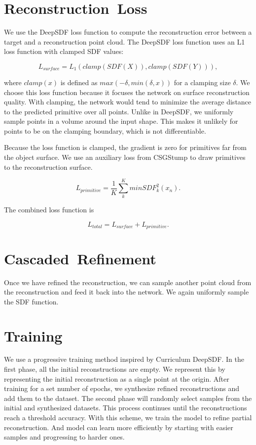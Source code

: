 \section{Reconstruction~Loss}
\label{sec:reconstruction_loss}

We use the DeepSDF loss function to compute the reconstruction error between a target and a reconstruction point cloud. The DeepSDF loss function uses an L1 loss function with clamped SDF values:

\[L_{surface}=L_1(clamp(SDF(X)), clamp(SDF(Y))),\]

where $clamp(x)$ is defined as $max(-\delta, min(\delta, x))$ for a clamping size $\delta$. We choose this loss function because it focuses the network on surface reconstruction quality. With clamping, the network would tend to minimize the average distance to the predicted primitive over all points. Unlike in DeepSDF, we uniformly sample points in a volume around the input shape. This makes it unlikely for points to be on the clamping boundary, which is not differentiable.

Because the loss function is clamped, the gradient is zero for primitives far from the object surface. We use an auxiliary loss from CSGStump to draw primitives to the reconstruction surface.

\[L_{primitive} = \frac{1}{K} \sum_{k}^{K} min SDF_k^2(x_n).\]

The combined loss function is


\[L_{total} = L_{surface} + L_{primitive}.\]


\section{Cascaded~Refinement}
\label{sec:cascaded_refinement}

Once we have refined the reconstruction, we can sample another point cloud from the reconstruction and feed it back into the network. We again uniformly sample the SDF function.


\section{Training}
\label{sec:training}

We use a progressive training method inspired by Curriculum DeepSDF. In the first phase, all the initial reconstructions are empty. We represent this by representing the initial reconstruction as a single point at the origin. After training for a set number of epochs, we synthesize refined reconstructions and add them to the dataset. The second phase will randomly select samples from the initial and synthesized datasets. This process continues until the reconstructions reach a threshold accuracy. With this scheme, we train the model to refine partial reconstruction. And model can learn more efficiently by starting with easier samples and progressing to harder ones.
